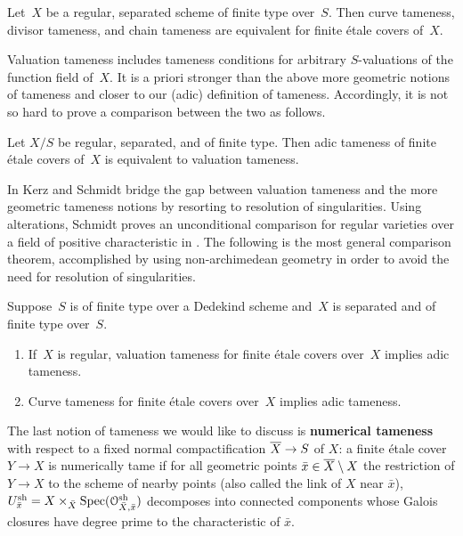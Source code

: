 \begin{prop}
    Let~$X$ be a regular, separated scheme of finite type over~$S$.
    Then curve tameness, divisor tameness, and chain tameness are equivalent for finite étale covers of~$X$.
\end{prop}

Valuation tameness includes tameness conditions for arbitrary $S$-valuations of the function field of~$X$.
It is a priori stronger than the above more geometric notions of tameness and closer to our (adic) definition of tameness.
Accordingly, it is not so hard to prove a comparison between the two as follows.

\begin{prop}
    Let $X/S$ be regular, separated, and of finite type.
    Then adic tameness of finite étale covers of~$X$ is equivalent to valuation tameness.
\end{prop}

In \cite{KerzSchmidt2010:DifferentNotionsTameness} Kerz and Schmidt bridge the gap between valuation tameness and the more geometric tameness notions by resorting to resolution of singularities.
Using alterations, Schmidt proves an unconditional comparison for regular varieties over a field of positive characteristic  in \cite[Theorem~4.4]{Schmidt-quasi-purity}.
The following is the most general comparison theorem, accomplished by using non-archimedean geometry in order to avoid the need for resolution of singularities.

\begin{prop}
    Suppose~$S$ is of finite type over a Dedekind scheme and~$X$ is separated and of finite type over~$S$.
    \begin{enumerate}
        \item If~$X$ is regular, valuation tameness for finite étale covers over~$X$ implies adic tameness.
        \item Curve tameness for finite étale covers over~$X$ implies adic tameness.
    \end{enumerate}
\end{prop}

The last notion of tameness we would like to discuss is \textbf{numerical tameness} with respect to a fixed normal compactification $\overline{X} \to S$ of $X$:
a finite étale cover $Y \to X$ is numerically tame if for all geometric points $\bar x \in \overline{X} \setminus X$ the restriction of $Y \to X$ to the scheme of nearby points (also called the link of $X$ near $\bar x$), $ U_{\bar x}^{{\rm sh}} = X \times_{\bar X} \operatorname{Spec}({\mathcal O}^{\rm sh}_{\bar X, \bar x}) $ decomposes into connected components whose Galois closures have degree prime to the characteristic of $\bar x$.

